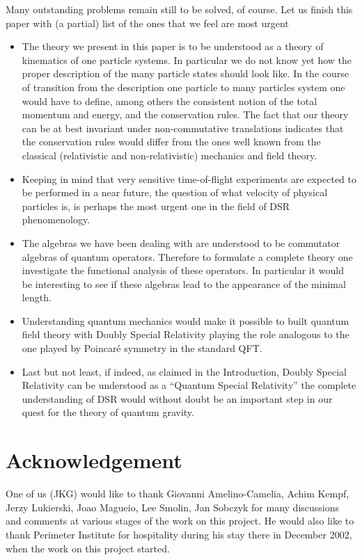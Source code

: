 \documentclass  [12pt] {article}
\begin{document}
Many outstanding problems remain still to  be solved, of course. Let us finish
this paper with (a partial) list of the ones that we feel are most urgent

\begin{itemize}
\item The theory we present in this paper is to be understood as a theory of kinematics of one
particle systems. In particular we do not know yet how the proper description
of the many particle states should look like. In the course of transition from
the description one particle to many particles system one would have to define,
among others the consistent notion of the total momentum and energy, and the
conservation rules. The fact that our theory can be at best invariant under
non-commutative translations indicates that the conservation rules would differ
from the ones well known from the classical (relativistic and non-relativistic)
mechanics and field theory.
\item Keeping in mind that very sensitive time-of-flight experiments \cite{Amelino-Camelia:2002vw}
are expected to be performed in
a near future, the question of what velocity of physical particles is, is
perhaps the most urgent one in the field of DSR phenomenology.
\item The algebras we have been dealing with are understood to be commutator algebras of quantum
operators. Therefore to formulate a complete theory one investigate the
functional analysis of these operators. In particular it would be interesting
to see if these algebras lead to the appearance of the minimal length.
\item Understanding quantum mechanics would make it possible to built quantum field theory with
Doubly Special Relativity playing the role analogous to the one played by
Poincar\'e symmetry in the standard QFT.
\item Last but not least, if indeed, as claimed in the Introduction, Doubly Special Relativity
can be understood as a ``Quantum Special Relativity'' the complete
understanding of DSR would without doubt be an important step in our quest for
the theory of quantum gravity.
\end{itemize}



\section*{Acknowledgement}
One of us (JKG) would like to thank Giovanni Amelino-Camelia, Achim Kempf,
Jerzy Lukierski, Joao Magueio, Lee Smolin, Jan Sobczyk  for many discussions
and comments at various stages of the work on this project. He would also like
to thank Perimeter Institute for hospitality during his stay there in December
2002, when the work on this project started.
\end{document}
